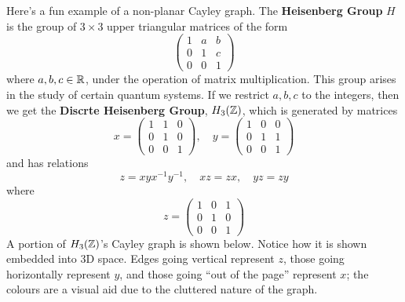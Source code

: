 \begin{example}
    Here's a fun example of a non-planar Cayley graph. The \textbf{Heisenberg Group} $H$ is the group of $3 \times 3$ upper triangular matrices of the form 
    \[\begin{pmatrix}
        1 & a & b \\ 0 & 1 & c \\ 0 & 0 & 1
    \end{pmatrix}\]
    where $a,b,c \in \mathbb{R}$, under the operation of matrix multiplication. This group arises in the study of certain quantum systems. If we restrict $a,b,c$ to the integers, then we get the \textbf{Discrte Heisenberg Group}, $H_3(\mathbb{Z})$, which is generated by matrices 
    \[x = \begin{pmatrix}
        1 & 1 & 0 \\ 0 & 1 & 0 \\ 0 & 0 & 1
    \end{pmatrix}, \quad y = \begin{pmatrix}
        1 & 0 & 0 \\ 0 & 1 & 1 \\ 0 & 0 & 1
    \end{pmatrix}\]
    and has relations 
    \[z = xyx^{-1}y^{-1}, \quad xz = zx, \quad yz = zy\]
    where 
    \[z = \begin{pmatrix}
        1 & 0 & 1 \\ 0 & 1 & 0 \\ 0 & 0 & 1
    \end{pmatrix}\]
    A portion of $H_3(\mathbb{Z})$'s Cayley graph is shown below. Notice how it is shown embedded into 3D space. Edges going vertical represent $z$, those going horizontally represent $y$, and those going ``out of the page'' represent $x$; the colours are a visual aid due to the cluttered nature of the graph. 


\end{example}
